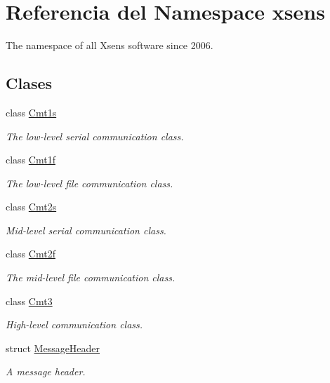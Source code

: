 \hypertarget{namespacexsens}{\section{\-Referencia del \-Namespace xsens}
\label{namespacexsens}
}


\-The namespace of all \-Xsens software since 2006.  


\subsection*{\-Clases}
\begin{DoxyCompactItemize}
\item 
class \hyperlink{classxsens_1_1Cmt1s}{\-Cmt1s}
\begin{DoxyCompactList}\small\item\em \-The low-\/level serial communication class. \end{DoxyCompactList}\item 
class \hyperlink{classxsens_1_1Cmt1f}{\-Cmt1f}
\begin{DoxyCompactList}\small\item\em \-The low-\/level file communication class. \end{DoxyCompactList}\item 
class \hyperlink{classxsens_1_1Cmt2s}{\-Cmt2s}
\begin{DoxyCompactList}\small\item\em \-Mid-\/level serial communication class. \end{DoxyCompactList}\item 
class \hyperlink{classxsens_1_1Cmt2f}{\-Cmt2f}
\begin{DoxyCompactList}\small\item\em \-The mid-\/level file communication class. \end{DoxyCompactList}\item 
class \hyperlink{classxsens_1_1Cmt3}{\-Cmt3}
\begin{DoxyCompactList}\small\item\em \-High-\/level communication class. \end{DoxyCompactList}\item 
struct \hyperlink{structxsens_1_1MessageHeader}{\-Message\-Header}
\begin{DoxyCompactList}\small\item\em \-A message header. \end{DoxyCompactList}\item 

\end{DoxyCompactItemize}
